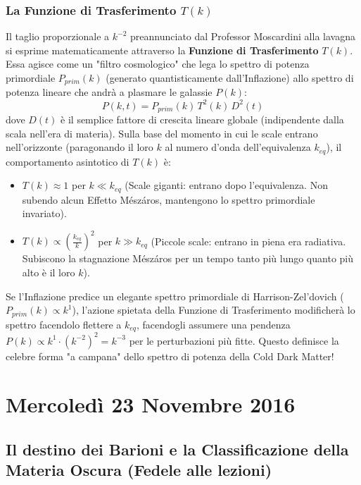 \documentclass[11pt,a4paper]{report}
\begin{document}
\subsection{La Funzione di Trasferimento $T(k)$}
Il taglio proporzionale a $k^{-2}$ preannunciato dal Professor Moscardini alla lavagna si esprime matematicamente attraverso la \textbf{Funzione di Trasferimento} $T(k)$. Essa agisce come un "filtro cosmologico" che lega lo spettro di potenza primordiale $P_{prim}(k)$ (generato quantisticamente dall'Inflazione) allo spettro di potenza lineare che andrà a plasmare le galassie $P(k)$:
\begin{equation}
P(k, t) = P_{prim}(k) \, T^2(k) \, D^2(t)
\end{equation}
dove $D(t)$ è il semplice fattore di crescita lineare globale (indipendente dalla scala nell'era di materia).
Sulla base del momento in cui le scale entrano nell'orizzonte (paragonando il loro $k$ al numero d'onda dell'equivalenza $k_{eq}$), il comportamento asintotico di $T(k)$ è:
\begin{itemize}
    \item $T(k) \approx 1$ per $k \ll k_{eq}$ (Scale giganti: entrano dopo l'equivalenza. Non subendo alcun Effetto Mészáros, mantengono lo spettro primordiale invariato).
    \item $T(k) \propto \left(\frac{k_{eq}}{k}\right)^2$ per $k \gg k_{eq}$ (Piccole scale: entrano in piena era radiativa. Subiscono la stagnazione Mészáros per un tempo tanto più lungo quanto più alto è il loro $k$).
\end{itemize}
Se l'Inflazione predice un elegante spettro primordiale di Harrison-Zel'dovich ($P_{prim}(k) \propto k^1$), l'azione spietata della Funzione di Trasferimento modificherà lo spettro facendolo flettere a $k_{eq}$, facendogli assumere una pendenza $P(k) \propto k^1 \cdot (k^{-2})^2 = k^{-3}$ per le perturbazioni più fitte. Questo definisce la celebre forma "a campana" dello spettro di potenza della Cold Dark Matter!

\chapter{Mercoledì 23 Novembre 2016}

\section{Il destino dei Barioni e la Classificazione della Materia Oscura (Fedele alle lezioni)}
\end{document}
